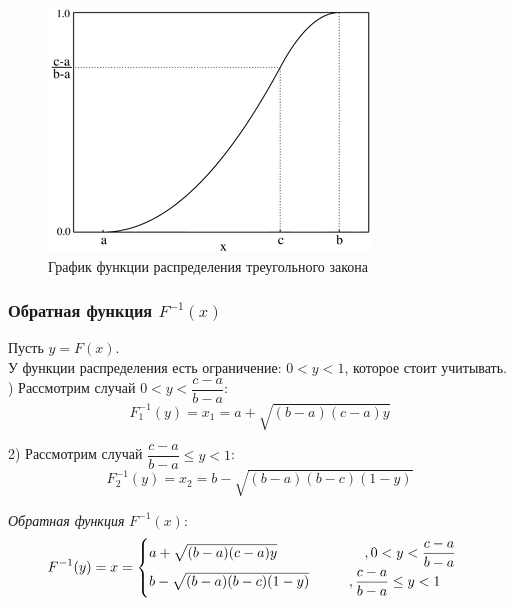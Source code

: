 \documentclass[14pt,fleqn]{extarticle}
\begin{document}
    \newpage
    \begin{figure}[h]
        \centering \includegraphics[scale=0.8]{plot2}
        \caption{График функции распределения треугольного закона}
    \end{figure}

    \subsubsection*{Обратная функция $F^{-1}(x)$}
    
    Пусть $y = F(x)$.\\
    У функции распределения есть ограничение: $0 < y < 1$, которое стоит учитывать.\\
    ) Рассмотрим случай $0 < y < \dfrac{c-a}{b-a}$:
    \[ F_1^{-1}(y) = x_1 = a + \sqrt{(b-a)(c-a)y} \]
    
    2) Рассмотрим случай $\dfrac{c-a}{b-a} \leq y < 1$:
    \[ F_2^{-1}(y) = x_2 = b - \sqrt{(b-a)(b-c)(1-y)} \]

    \textit{Обратная функция} $F^{-1}(x)$:
    \begin{align*}
        F^{-1}(y) = x =
        \begin{cases}
            a + \sqrt{(b-a)(c-a)y} \hspace{2.2cm} , 0 < y < \dfrac{c-a}{b-a}\\
            b - \sqrt{(b-a)(b-c)(1-y)} \hspace{1cm} , \dfrac{c-a}{b-a} \leq y < 1\\
        \end{cases}
    \end{align*}
\end{document}

